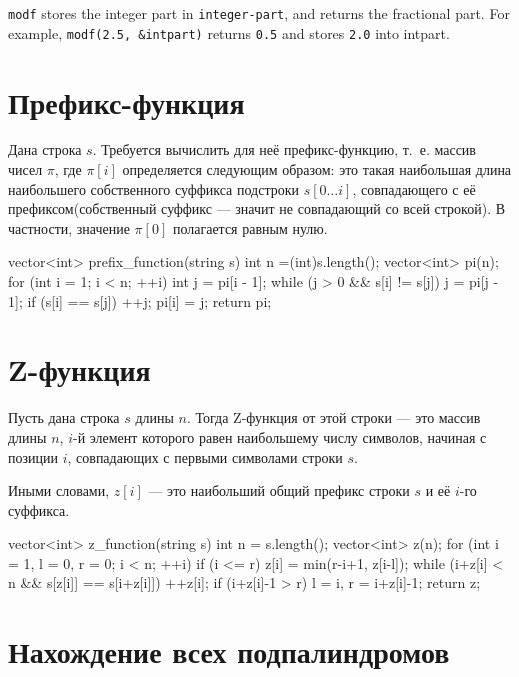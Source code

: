 \documentclass[12pt, titlepage]{article}
\renewcommand{\tt}[1]{\texttt{\small #1}}
\begin{document}
\tt{modf} stores the integer part in \tt{*integer-part}, and returns the fractional part. For example, \tt{modf(2.5, \&intpart)} returns \tt{0.5} and stores \tt{2.0} into intpart.


\section{Префикс-функция}

Дана строка $s$. Требуется вычислить для неё префикс-функцию, т.~е. массив чисел $\pi$, где $\pi[i]$ определяется следующим образом: это такая наибольшая длина наибольшего собственного суффикса подстроки $s[0 \ldots i]$, совпадающего с её префиксом(собственный суффикс — значит не совпадающий со всей строкой). В частности, значение $\pi[0]$ полагается равным нулю.

\begin{cppcode}
vector<int> prefix_function(string s)
{
    int n =(int)s.length();
    vector<int> pi(n);
    for (int i = 1; i < n; ++i)
    {
        int j = pi[i - 1];
        while (j > 0 && s[i] != s[j])
            j = pi[j - 1];
        if (s[i] == s[j]) ++j;
        pi[i] = j;
    }
    return pi;
}
\end{cppcode}



\section{Z-функция}

Пусть дана строка $s$ длины $n$. Тогда Z-функция от этой строки — это массив длины $n$, $i$-й элемент которого равен наибольшему числу символов, начиная с позиции $i$, совпадающих с первыми символами строки $s$.

Иными словами, $z[i]$ — это наибольший общий префикс строки $s$ и её $i$-го суффикса.

\begin{cppcode}
vector<int> z_function(string s) {
    int n = s.length();
    vector<int> z(n);
    for (int i = 1, l = 0, r = 0; i < n; ++i) {
        if (i <= r)
            z[i] = min(r-i+1, z[i-l]);
        while (i+z[i] < n && s[z[i]] == s[i+z[i]])
            ++z[i];
        if (i+z[i]-1 > r)
            l = i,  r = i+z[i]-1;
    }
    return z;
}
\end{cppcode}

\section{Нахождение всех подпалиндромов}
\end{document}
